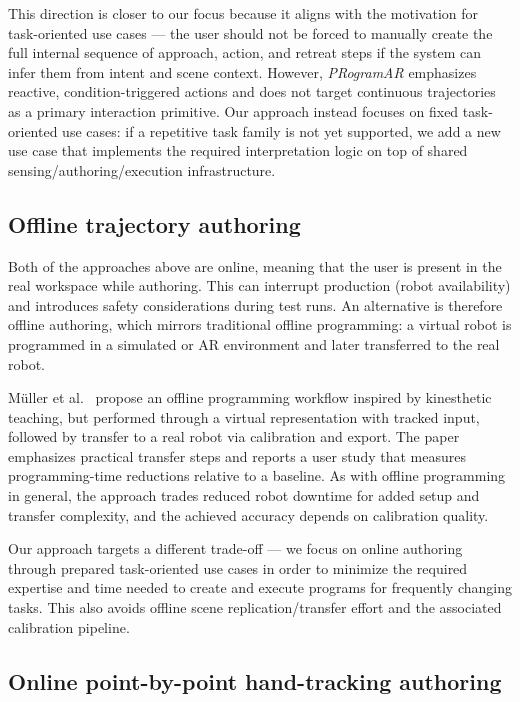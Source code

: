 This direction is closer to our focus because it aligns with the motivation for task-oriented use cases --- the user should not be forced to manually create the full internal sequence of approach, action, and retreat steps if the system can infer them from intent and scene context. However, \emph{PRogramAR} emphasizes reactive, condition-triggered actions and does not target continuous trajectories as a primary interaction primitive. Our approach instead focuses on fixed task-oriented use cases: if a repetitive task family is not yet supported, we add a new use case that implements the required interpretation logic on top of shared sensing/authoring/execution infrastructure.

\subsection{Offline trajectory authoring}

Both of the approaches above are online, meaning that the user is present in the real workspace while authoring. This can interrupt production (robot availability) and introduces safety considerations during test runs. An alternative is therefore offline authoring, which mirrors traditional offline programming: a virtual robot is programmed in a simulated or AR environment and later transferred to the real robot.

Müller et al.~\cite{Muller2024} propose an offline programming workflow inspired by kinesthetic teaching, but performed through a virtual representation with tracked input, followed by transfer to a real robot via calibration and export. The paper emphasizes practical transfer steps and reports a user study that measures programming-time reductions relative to a baseline. As with offline programming in general, the approach trades reduced robot downtime for added setup and transfer complexity, and the achieved accuracy depends on calibration quality.

Our approach targets a different trade-off --- we focus on online authoring through prepared task-oriented use cases in order to minimize the required expertise and time needed to create and execute programs for frequently changing tasks. This also avoids offline scene replication/transfer effort and the associated calibration pipeline.

\subsection{Online point-by-point hand-tracking authoring}


